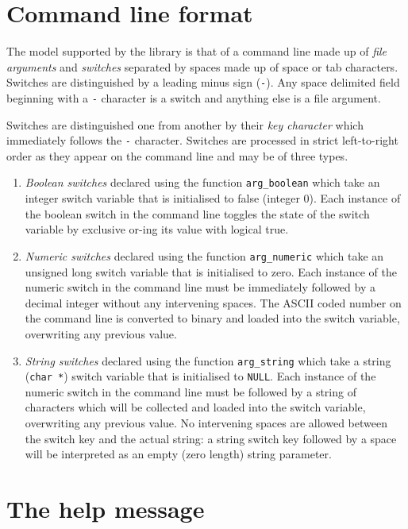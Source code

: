 \section{Command line format}

The model supported by the library is that of a command line made up of
{\em file arguments} and {\em switches} separated by spaces made up of
space or tab characters. Switches are distinguished by a leading minus
sign ({\tt -}). Any space delimited field beginning with a {\tt -}
character is a switch and anything else is a file argument. 

Switches are distinguished one from another by their {\em key character}
which immediately follows the {\tt -} character. Switches are processed
in strict left-to-right order as they appear on the command line and may
be of three types.
\begin{enumerate} 

\item {\em Boolean switches} declared using the function
\verb+arg_boolean+ which take an integer switch variable that is
initialised to {\sc false} (integer 0). Each instance of the boolean
switch in the command line toggles the state of the switch variable by
exclusive {\sc or}-ing its value with logical {\sc true}. 

\item {\em Numeric switches} declared using the function
\verb+arg_numeric+ which take an unsigned long switch variable that is
initialised to zero. Each instance of the numeric switch in the command
line must be immediately followed by a decimal integer without any
intervening spaces. The ASCII coded number on the command line is
converted to binary and loaded into the switch variable, overwriting any
previous value.

\item {\em String switches\/} declared using the function
\verb+arg_string+ which take a string ({\tt char *}) switch variable
that is initialised to {\tt NULL}. Each instance of the numeric switch
in the command line must be followed by a string of characters which
will be collected and loaded into the switch variable, overwriting any
previous value. No intervening spaces are allowed between the switch key
and the actual string: a string switch key followed by a space will be
interpreted as an empty (zero length) string parameter.

\end{enumerate}

\section{The help message}

